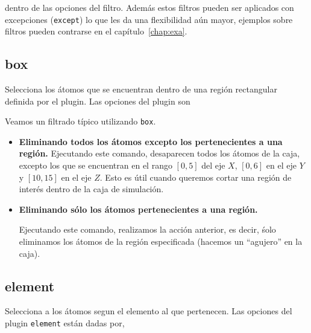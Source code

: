 
dentro de las opciones del filtro. Adem\'as estos filtros pueden ser aplicados
con excepciones (\verb|except|) lo que les da una flexibilidad a\'un mayor,
ejemplos sobre filtros pueden contrarse en el cap\'itulo~\ref{chap:exa}.

\subsection{box}
Selecciona los \'atomos que se encuentran dentro de una regi\'on rectangular
definida por el plugin. Las opciones del plugin son


Veamos un filtrado t\'ipico utilizando \verb|box|.

\begin{itemize}
 \item \textbf{Eliminando todos los \'atomos excepto los pertenecientes a una
regi\'on.}
Ejecutando este comando, desaparecen todos los \'atomos de la caja, excepto los
que se encuentran en el rango $[0,5]$ del eje $X$, $[0,6]$ en el eje $Y$ y
$[10,15]$ en el eje $Z$. Esto es \'util cuando queremos cortar una regi\'on de
inter\'es dentro de la caja de simulaci\'on.

 
 \item \textbf{Eliminando s\'olo los \'atomos pertenecientes a una regi\'on.}

Ejecutando este comando, realizamos la acci\'on anterior, es decir, \'solo
eliminamos los \'atomos de la regi\'on especificada (hacemos un ``agujero'' en
la caja).
\end{itemize}

\subsection{element}
Selecciona a los \'atomos segun el elemento al que pertenecen. Las opciones del
plugin \verb|element| est\'an dadas por,


